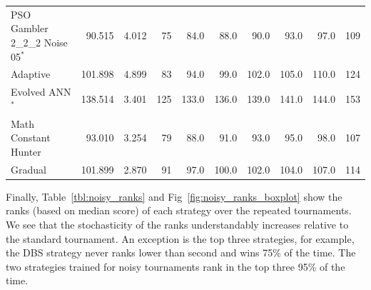 \documentclass[10pt,letterpaper]{article}
\begin{document}
\begin{table}[!hbtp]
\begin{tabular}{lrrrrrrrrr}
PSO Gambler 2\_2\_2 Noise 05$^{*}$ &   90.515 &  4.012 &   75 &   84.0 &   88.0 &   90.0 &   93.0 &   97.0 &  109 \\
Adaptive                         &  101.898 &  4.899 &   83 &   94.0 &   99.0 &  102.0 &  105.0 &  110.0 &  124 \\
Evolved ANN$^{*}$                &  138.514 &  3.401 &  125 &  133.0 &  136.0 &  139.0 &  141.0 &  144.0 &  153 \\
Math Constant Hunter             &   93.010 &  3.254 &   79 &   88.0 &   91.0 &   93.0 &   95.0 &   98.0 &  107 \\
Gradual                          &  101.899 &  2.870 &   91 &   97.0 &  100.0 &  102.0 &  104.0 &  107.0 &  114 \\
\bottomrule
\end{tabular}
        \label{tbl:noisy_wins}
\end{table}

Finally, Table~\ref{tbl:noisy_ranks} and
Fig~\ref{fig:noisy_ranks_boxplot} show the ranks (based on median score)
of each strategy over the repeated tournaments. We see that the stochasticity
of the ranks understandably increases relative to the standard tournament. An
exception is the top three strategies, for example, the DBS strategy never ranks
lower than
second and wins 75\% of the time. The two strategies trained for noisy
tournaments rank in the top three 95\% of the time.
\end{document}
